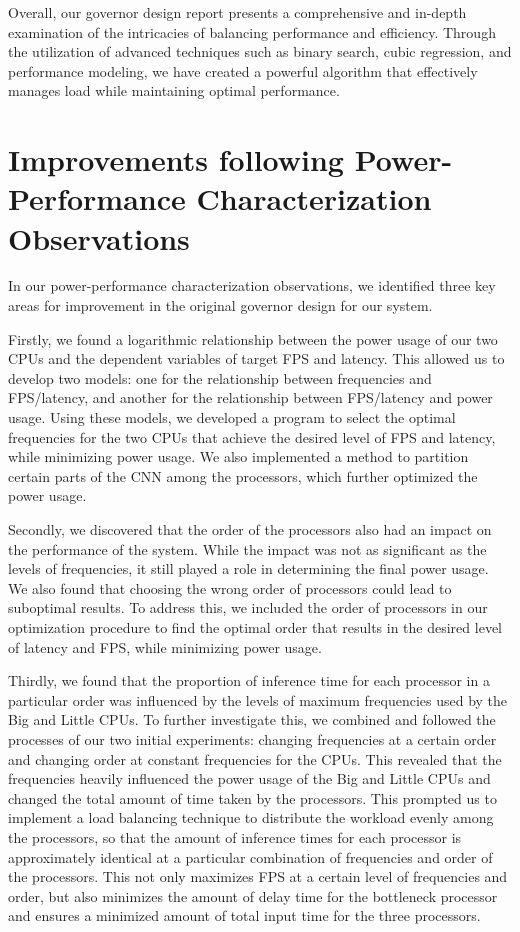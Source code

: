 \documentclass[a4paper, 12pt, fleqn]{article}
\begin{document}
Overall, our governor design report presents a comprehensive and in-depth examination of the intricacies of balancing performance and efficiency. Through the utilization of advanced techniques such as binary search, cubic regression, and performance modeling, we have created a powerful algorithm that effectively manages load while maintaining optimal performance.


\section{Improvements following Power-Performance Characterization Observations}
In our power-performance characterization observations, we identified three key areas for improvement in the original governor design for our system.

Firstly, we found a logarithmic relationship between the power usage of our two CPUs and the dependent variables of target FPS and latency. This allowed us to develop two models: one for the relationship between frequencies and FPS/latency, and another for the relationship between FPS/latency and power usage. Using these models, we developed a program to select the optimal frequencies for the two CPUs that achieve the desired level of FPS and latency, while minimizing power usage. We also implemented a method to partition certain parts of the CNN among the processors, which further optimized the power usage.

Secondly, we discovered that the order of the processors also had an impact on the performance of the system. While the impact was not as significant as the levels of frequencies, it still played a role in determining the final power usage. We also found that choosing the wrong order of processors could lead to suboptimal results. To address this, we included the order of processors in our optimization procedure to find the optimal order that results in the desired level of latency and FPS, while minimizing power usage.

Thirdly, we found that the proportion of inference time for each processor in a particular order was influenced by the levels of maximum frequencies used by the Big and Little CPUs. To further investigate this, we combined and followed the processes of our two initial experiments: changing frequencies at a certain order and changing order at constant frequencies for the CPUs. This revealed that the frequencies heavily influenced the power usage of the Big and Little CPUs and changed the total amount of time taken by the processors. This prompted us to implement a load balancing technique to distribute the workload evenly among the processors, so that the amount of inference times for each processor is approximately identical at a particular combination of frequencies and order of the processors. This not only maximizes FPS at a certain level of frequencies and order, but also minimizes the amount of delay time for the bottleneck processor and ensures a minimized amount of total input time for the three processors.
\end{document}
